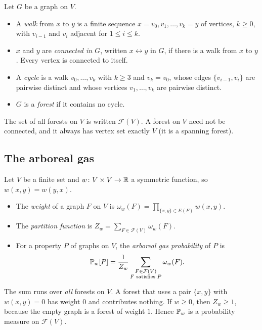\documentclass[11pt]{amsart}
\numberwithin{equation}{section}
\numberwithin{theorem}{section}
\newcommand{\conn}{\leftrightarrow}
\begin{document}
\begin{definition}\label{def:walks}
Let $G$ be a graph on $V$.
\begin{itemize}
\item A \emph{walk} from $x$ to $y$ is a finite sequence $x=v_0,v_1,\dots,v_k=y$ of vertices,
  $k\ge 0$, with $v_{i-1}$ and $v_i$ adjacent for $1\le i\le k$.
\item $x$ and $y$ are \emph{connected in $G$}, written $x\conn y$ in $G$, if there is a walk
  from $x$ to $y$. Every vertex is connected to itself.
\item A \emph{cycle} is a walk $v_0,\dots,v_k$ with $k\ge 3$ and $v_k=v_0$, whose edges
  $\{v_{i-1},v_i\}$ are pairwise distinct and whose vertices $v_1,\dots,v_k$ are pairwise
  distinct.
\item $G$ is a \emph{forest} if it contains no cycle.
\end{itemize}
The set of all forests on $V$ is written $\mathcal{F}(V)$. A forest on $V$ need not be
connected, and it always has vertex set exactly $V$ (it is a spanning forest).
\end{definition}

\subsection{The arboreal gas}

\begin{definition}\label{def:arboreal}
Let $V$ be a finite set and $w\colon V\times V\to\R$ a symmetric function, so $w(x,y)=w(y,x)$.
\begin{itemize}
\item The \emph{weight} of a graph $F$ on $V$ is
  $\displaystyle \omega_w(F)=\prod_{\{x,y\}\in E(F)} w(x,y)$.
\item The \emph{partition function} is $\displaystyle Z_w=\sum_{F\in\mathcal F(V)}\omega_w(F)$.
\item For a property $P$ of graphs on $V$, the \emph{arboreal gas probability} of $P$ is
  \begin{equation}\label{e:P-forest}
    \P_w[P]=\frac{1}{Z_w}\sum_{\substack{F\in\mathcal F(V)\\ F\text{ satisfies }P}}\omega_w(F).
  \end{equation}
\end{itemize}
The sum runs over \emph{all} forests on $V$. A forest that uses a pair $\{x,y\}$ with
$w(x,y)=0$ has weight $0$ and contributes nothing. If $w\ge 0$, then $Z_w\ge 1$, because the
empty graph is a forest of weight $1$. Hence $\P_w$ is a probability measure on $\mathcal F(V)$.
\end{definition}
\end{document}
